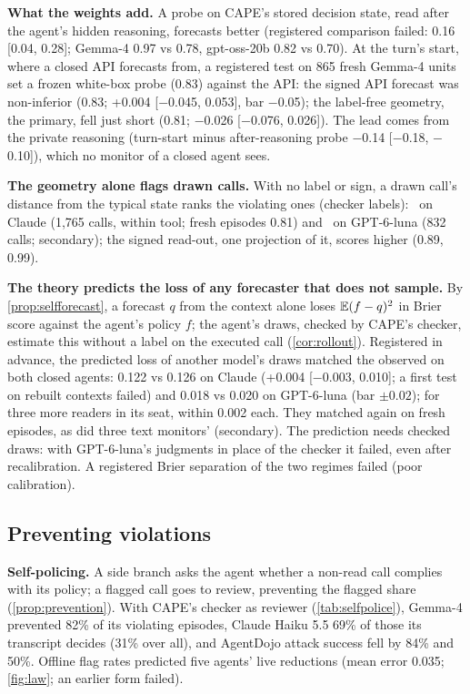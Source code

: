 \textbf{What the weights add.} A probe on CAPE's stored decision state, read after the agent's hidden reasoning, forecasts better (registered comparison failed: 0.16 [0.04, 0.28]; Gemma-4 0.97 vs 0.78, gpt-oss-20b 0.82 vs 0.70). At the turn's start, where a closed API forecasts from, a registered test on 865 fresh Gemma-4 units set a frozen white-box probe (0.83) against the API: the signed API forecast was non-inferior (0.83; +0.004 [$-$0.045, 0.053], bar $-$0.05); the label-free geometry, the primary, fell just short (0.81; $-$0.026 [$-$0.076, 0.026]). The lead comes from the private reasoning (turn-start minus after-reasoning probe $-$0.14 [$-$0.18, $-$0.10]), which no monitor of a closed agent sees.

\textbf{The geometry alone flags drawn calls.} With no label or sign, a drawn call's distance from the typical state ranks the violating ones (checker labels): \GGeoClaude\ on Claude (1{,}765 calls, within tool; fresh episodes 0.81) and \GGeoGpt\ on GPT-6-luna (832 calls; secondary); the signed read-out, one projection of it, scores higher (0.89, 0.99).

\textbf{The theory predicts the loss of any forecaster that does not sample.} By \cref{prop:selfforecast}, a forecast $q$ from the context alone loses $\mathbb{E}(f-q)^2$ in Brier score against the agent's policy $f$; the agent's draws, checked by CAPE's checker, estimate this without a label on the executed call (\cref{cor:rollout}). Registered in advance, the predicted loss of another model's draws matched the observed on both closed agents: 0.122 vs 0.126 on Claude (+0.004 [$-$0.003, 0.010]; a first test on rebuilt contexts failed) and 0.018 vs 0.020 on GPT-6-luna (bar $\pm0.02$); for three more readers in its seat, within 0.002 each. They matched again on fresh episodes, as did three text monitors' (secondary). The prediction needs checked draws: with GPT-6-luna's judgments in place of the checker it failed, even after recalibration. A registered Brier separation of the two regimes failed (poor calibration).

\subsection{Preventing violations}
\label{sec:prevent-live}
\textbf{Self-policing.} A side branch asks the agent whether a non-read call complies with its policy; a flagged call goes to review, preventing the flagged share (\cref{prop:prevention}). With CAPE's checker as reviewer (\cref{tab:selfpolice}), Gemma-4 prevented 82\% of its violating episodes, Claude Haiku 5.5 69\% of those its transcript decides (31\% over all), and AgentDojo attack success fell by 84\% and 50\%. Offline flag rates predicted five agents' live reductions (mean error 0.035; \cref{fig:law}; an earlier form failed).

